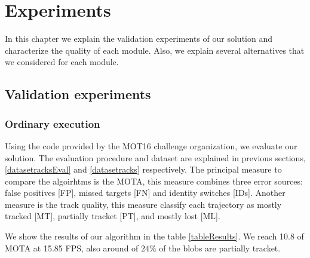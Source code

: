 \chapter{Experiments}\label{cap.experiments}


In this chapter we explain the validation experiments of our solution and characterize the quality of each module. Also, we explain several alternatives that we considered for each module.


\section{Validation experiments}\label{valdiation}

\subsection{Ordinary execution}



Using the code provided by the MOT16 challenge organization, we evaluate our solution. The evaluation procedure and dataset are explained in previous sections,  \ref{datasetracksEval} and \ref{datasetracks} respectively. The principal measure to compare the algoirhtms is the MOTA, this measure combines three error sources: false positives [FP], missed targets [FN] and identity switches [IDs]. Another measure is the track quality, this measure classify each trajectory as mostly tracked [MT], partially tracket [PT], and mostly lost [ML]. 


We show the results of our algorithm in the table \ref{tableResults}. We reach 10.8 of MOTA at 15.85 FPS, also around of $24 \%$  of the blobs are partially tracket.




%


